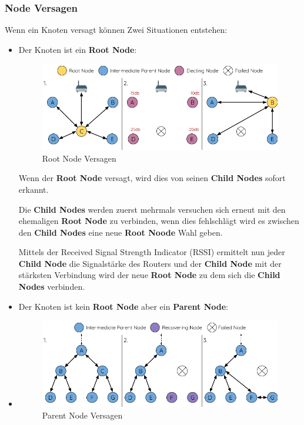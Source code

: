 \subsubsection{Node Versagen}
Wenn ein Knoten versagt können Zwei Situationen entstehen:
\begin{itemize}
    \item Der Knoten ist ein \textbf{Root Node}:
    
    \begin{figure}[H] \begin{center}
        \includegraphics[scale=0.5]{diagrams/mesh-root-node-failure.png}
        \caption{Root Node Versagen\cite{esp-mesh}}
        \end{center}    
    \end{figure}

    Wenn der \textbf{Root Node} versagt, wird dies von seinen \textbf{Child Nodes} sofort erkannt.
    
    Die \textbf{Child Nodes} werden zuerst mehrmals versuchen sich erneut mit den ehemaligen \textbf{Root Node} zu verbinden, wenn dies fehlschlägt wird es zwischen den \textbf{Child Nodes} eine neue \textbf{Root Noode} Wahl geben.
    
    Mittels der Received Signal Strength Indicator (RSSI) ermittelt nun jeder \textbf{Child Node} die Signalstärke des Routers und der \textbf{Child Node} mit der stärksten Verbindung wird der neue \textbf{Root Node} zu dem sich die \textbf{Child Nodes} verbinden.

    \item Der Knoten ist kein \textbf{Root Node} aber ein \textbf{Parent Node}:
    \item \begin{figure}[H] \begin{center}
        \includegraphics[scale=0.5]{diagrams/mesh-parent-node-failure.png}
        \caption{Parent Node Versagen\cite{esp-mesh}}
        \end{center}    
    \end{figure}
\end{itemize}

